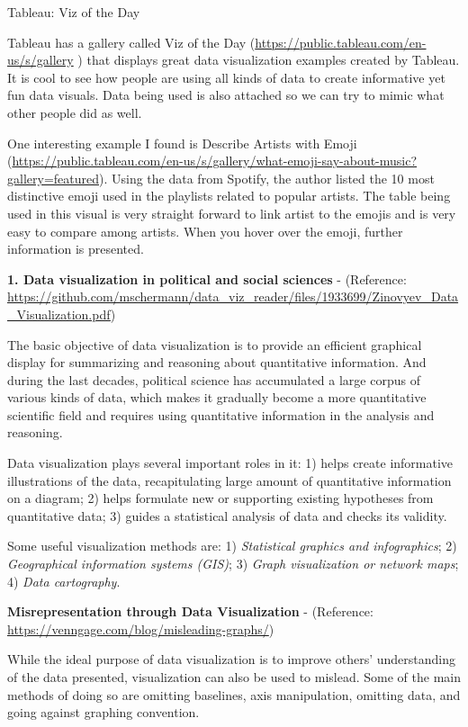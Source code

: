 \documentclass[]{book}
\theoremstyle{definition}
\theoremstyle{definition}
\theoremstyle{definition}
\theoremstyle{remark}
\begin{document}
Tableau: Viz of the Day

Tableau has a gallery called Viz of the Day
(\url{https://public.tableau.com/en-us/s/gallery} ) that displays great
data visualization examples created by Tableau. It is cool to see how
people are using all kinds of data to create informative yet fun data
visuals. Data being used is also attached so we can try to mimic what
other people did as well.

One interesting example I found is Describe Artists with Emoji
(\url{https://public.tableau.com/en-us/s/gallery/what-emoji-say-about-music?gallery=featured}).
Using the data from Spotify, the author listed the 10 most distinctive
emoji used in the playlists related to popular artists. The table being
used in this visual is very straight forward to link artist to the
emojis and is very easy to compare among artists. When you hover over
the emoji, further information is presented.

\textbf{1. Data visualization in political and social sciences} -
(Reference:
\url{https://github.com/mschermann/data_viz_reader/files/1933699/Zinovyev_Data_Visualization.pdf})

The basic objective of data visualization is to provide an efficient
graphical display for summarizing and reasoning about quantitative
information. And during the last decades, political science has
accumulated a large corpus of various kinds of data, which makes it
gradually become a more quantitative scientific field and requires using
quantitative information in the analysis and reasoning.

Data visualization plays several important roles in it: 1) helps create
informative illustrations of the data, recapitulating large amount of
quantitative information on a diagram; 2) helps formulate new or
supporting existing hypotheses from quantitative data; 3) guides a
statistical analysis of data and checks its validity.

Some useful visualization methods are: 1) \emph{Statistical graphics and
infographics}; 2) \emph{Geographical information systems (GIS)}; 3)
\emph{Graph visualization or network maps}; 4) \emph{Data cartography}.

\textbf{Misrepresentation through Data Visualization} - (Reference:
\url{https://venngage.com/blog/misleading-graphs/})

While the ideal purpose of data visualization is to improve others'
understanding of the data presented, visualization can also be used to
mislead. Some of the main methods of doing so are omitting baselines,
axis manipulation, omitting data, and going against graphing convention.
\end{document}

